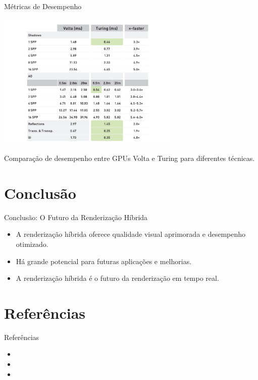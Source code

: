 \documentclass[aspectratio=169,xcolor=table]{beamer}
\begin{document}
\begin{frame}{Métricas de Desempenho}
    \begin{center}
        \includegraphics[width=0.65\textwidth]{metricas}
    \end{center}
    \begin{center}
        \small{Comparação de desempenho entre GPUs Volta e Turing para diferentes técnicas.}
    \end{center}
\end{frame}

\section{Conclusão}
\begin{frame}{Conclusão: O Futuro da Renderização Híbrida}
    \begin{itemize}
        \item A renderização híbrida oferece qualidade visual aprimorada e desempenho otimizado.
        \item Há grande potencial para futuras aplicações e melhorias.
        \item A renderização híbrida é o futuro da renderização em tempo real.
    \end{itemize}
\end{frame}

\section{Referências}
\begin{frame}{Referências}
    \begin{itemize}
        \item {}
        \item {}
        \item {}
    \end{itemize}
\end{frame}
\end{document}
